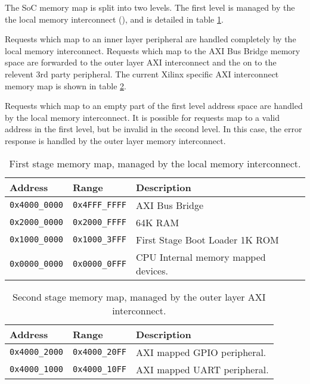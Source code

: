
The SoC memory map is split into two levels.
The first level is managed by the the local memory interconnect
(),
and is detailed in table \ref{tab:memory-map:1}.

Requests which map to an inner layer peripheral are handled completely
by the local memory interconnect.
Requests which map to the AXI Bus Bridge memory space are forwarded to
the outer layer AXI interconnect and the on to the relevent 3rd party
peripheral.
The current Xilinx specific AXI interconnect memory map is shown in
table \ref{tab:memory-map:2}.

Requests which map to an empty part of the first level address space
are handled by the local memory interconnect.
It is possible for requests map to a valid address in the first
level, but be invalid in the second level.
In this case, the error response is handled by the
outer layer memory interconnect.

\begin{table}[H]
\centering
\begin{tabular}{lll}
Address      & Range        & Description   \\ \hline
{\tt 0x4000\_0000} & {\tt 0x4FFF\_FFFF} & AXI Bus Bridge                    \\
{\tt 0x2000\_0000} & {\tt 0x2000\_FFFF} & 64K RAM                           \\
{\tt 0x1000\_0000} & {\tt 0x1000\_3FFF} & First Stage Boot Loader 1K ROM    \\
{\tt 0x0000\_0000} & {\tt 0x0000\_0FFF} & CPU Internal memory mapped devices.
\end{tabular}
\caption{
    First stage \SCARVSOC memory map, managed by the local memory
    interconnect.
}
\label{tab:memory-map:1}
\end{table}

\begin{table}[H]
\centering
\begin{tabular}{lll}
Address      & Range        & Description  \\ \hline
{\tt 0x4000\_2000} & {\tt 0x4000\_20FF} & AXI mapped GPIO peripheral.  \\
{\tt 0x4000\_1000} & {\tt 0x4000\_10FF} & AXI mapped UART peripheral.  \\
\end{tabular}
\caption{
    Second stage \SCARVSOC memory map, managed by the outer layer
    AXI interconnect.
}
\label{tab:memory-map:2}
\end{table}

